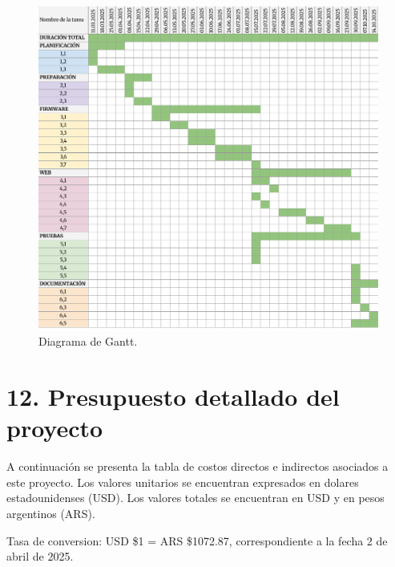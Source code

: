 \documentclass[
11pt, %
]{charter}
\begin{document}
\begin{figure}[htpb]
\centering 
\includegraphics[height=.62\textheight]{./Figuras/Gantt.pdf}
\caption{Diagrama de Gantt.}
\label{fig:diagGantt}
\end{figure}


\section{12. Presupuesto detallado del proyecto}
\label{sec:presupuesto}

A continuación se presenta la tabla de costos directos e indirectos asociados a este proyecto. Los valores unitarios se encuentran expresados en dolares estadounidenses (USD). Los valores totales se encuentran en USD y en pesos argentinos (ARS). 

Tasa de conversion: USD \$1 = ARS \$1072.87, correspondiente a la fecha 2 de abril de 2025.
\end{document}

